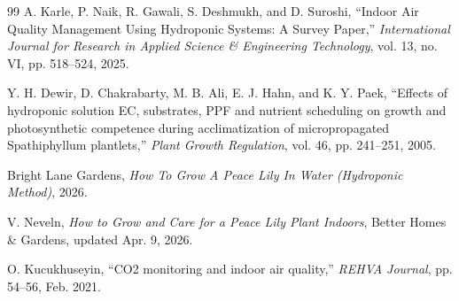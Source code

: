 \documentclass[14pt,a4paper]{report}
\begin{document}
\begin{thebibliography}{99}
A. Karle, P. Naik, R. Gawali, S. Deshmukh, and D. Suroshi, ``Indoor Air Quality Management Using Hydroponic Systems: A Survey Paper,'' \textit{International Journal for Research in Applied Science \& Engineering Technology}, vol. 13, no. VI, pp. 518--524, 2025.

Y. H. Dewir, D. Chakrabarty, M. B. Ali, E. J. Hahn, and K. Y. Paek, ``Effects of hydroponic solution EC, substrates, PPF and nutrient scheduling on growth and photosynthetic competence during acclimatization of micropropagated Spathiphyllum plantlets,'' \textit{Plant Growth Regulation}, vol. 46, pp. 241--251, 2005.

Bright Lane Gardens, \textit{How To Grow A Peace Lily In Water (Hydroponic Method)}, 2026.

V. Neveln, \textit{How to Grow and Care for a Peace Lily Plant Indoors}, Better Homes \& Gardens, updated Apr. 9, 2026.

O. Kucukhuseyin, ``CO2 monitoring and indoor air quality,'' \textit{REHVA Journal}, pp. 54--56, Feb. 2021.
\end{thebibliography}
\end{document}
